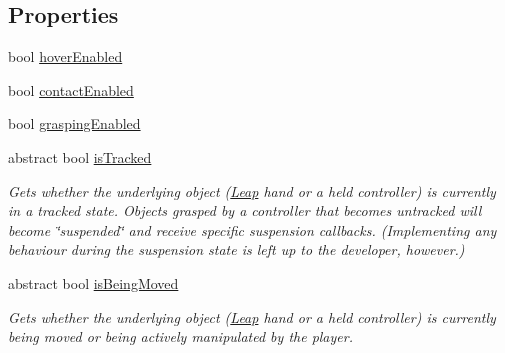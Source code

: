 \subsection*{Properties}
\begin{DoxyCompactItemize}
\item 
bool \mbox{\hyperlink{class_leap_1_1_unity_1_1_interaction_1_1_interaction_controller_a17364abc0f18966b489ee8125c0386ff}{hover\+Enabled}}
\item 
bool \mbox{\hyperlink{class_leap_1_1_unity_1_1_interaction_1_1_interaction_controller_acb035b29714d862ed7378ac8c71f03e1}{contact\+Enabled}}
\item 
bool \mbox{\hyperlink{class_leap_1_1_unity_1_1_interaction_1_1_interaction_controller_aa8c6c126e8c40ce9874739f531c7f53f}{grasping\+Enabled}}
\item 
abstract bool \mbox{\hyperlink{class_leap_1_1_unity_1_1_interaction_1_1_interaction_controller_a592bdfe3ece33ca9ce7a35f279fcacbf}{is\+Tracked}}
\begin{DoxyCompactList}\small\item\em Gets whether the underlying object (\mbox{\hyperlink{namespace_leap_1_1_unity_1_1_leap}{Leap}} hand or a held controller) is currently in a tracked state. Objects grasped by a controller that becomes untracked will become \char`\"{}suspended\char`\"{} and receive specific suspension callbacks. (Implementing any behaviour during the suspension state is left up to the developer, however.) \end{DoxyCompactList}\item 
abstract bool \mbox{\hyperlink{class_leap_1_1_unity_1_1_interaction_1_1_interaction_controller_a13751c0258117ae3af9b7d116f749a12}{is\+Being\+Moved}}
\begin{DoxyCompactList}\small\item\em Gets whether the underlying object (\mbox{\hyperlink{namespace_leap_1_1_unity_1_1_leap}{Leap}} hand or a held controller) is currently being moved or being actively manipulated by the player. \end{DoxyCompactList}\item 

\end{DoxyCompactItemize}
